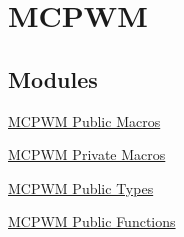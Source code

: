 \hypertarget{group___m_c_p_w_m}{\section{\-M\-C\-P\-W\-M}
\label{group___m_c_p_w_m}
}
\subsection*{\-Modules}
\begin{DoxyCompactItemize}
\item 
\hyperlink{group___m_c_p_w_m___public___macros}{\-M\-C\-P\-W\-M Public Macros}
\item 
\hyperlink{group___m_c_p_w_m___private___macros}{\-M\-C\-P\-W\-M Private Macros}
\item 
\hyperlink{group___m_c_p_w_m___public___types}{\-M\-C\-P\-W\-M Public Types}
\item 
\hyperlink{group___m_c_p_w_m___public___functions}{\-M\-C\-P\-W\-M Public Functions}
\end{DoxyCompactItemize}
